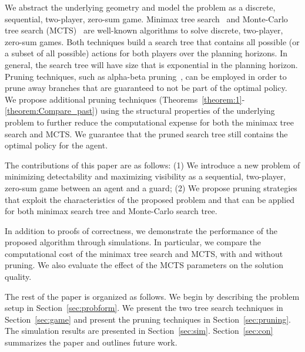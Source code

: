 \documentclass[10 pt, conference]{ieeeconf}
\newcommand{\PT}[1]{{\footnotesize\color{blue}[{\bf PT:} \textsf{#1}]}} %
\begin{document}

We abstract the underlying geometry and model the problem as a discrete, sequential, two-player, zero-sum game.
Minimax tree search~\cite{gelly2006exploration} and Monte-Carlo tree search (MCTS)~\cite{russell2009artificial} are well-known algorithms to solve discrete, two-player, zero-sum games.
Both techniques build a search tree that contains all possible (or a subset of all possible) actions for both players over the planning horizons. In general, the search tree will have size that is exponential in the planning horizon. Pruning techniques, such as alpha-beta pruning~\cite{russell2016artificial}, can be employed in order to prune away branches that are guaranteed to not be part of the optimal policy.
We propose additional pruning techniques (Theorems~\ref{theorem:1}-\ref{theorem:Compare_past}) using the structural properties of the underlying problem to further reduce the computational expense for both the minimax tree search and MCTS. We guarantee that the pruned search tree still contains the optimal policy for the agent.

The contributions of this paper are as follows: (1) We introduce a new problem of minimizing detectability and maximizing visibility as a sequential, two-player, zero-sum game between an agent and a guard; (2) We propose pruning strategies that exploit the characteristics of the proposed problem and that can be applied for both minimax search tree and Monte-Carlo search tree. 

In addition to proofs of correctness, we demonstrate the performance of the proposed algorithm through simulations. In particular, we compare the computational cost of the minimax tree search and MCTS, with and without pruning. We also evaluate the effect of the MCTS parameters on the solution quality.

The rest of the paper is organized as follows. We begin by describing the problem setup in Section~\ref{sec:probform}. We present the two tree search techniques in Section~\ref{sec:game} and present the pruning techniques in Section~\ref{sec:pruning}. The simulation results are presented in Section~\ref{sec:sim}. Section~\ref{sec:con} summarizes the paper and outlines future work. 
\end{document}
